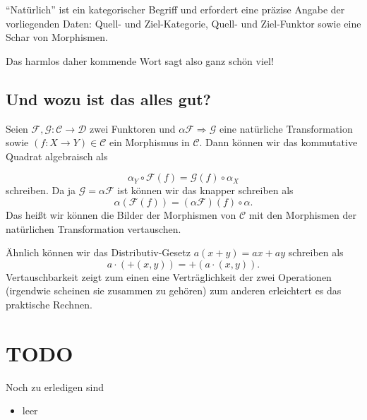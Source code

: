 \documentclass[a4paper]{amsart}
\theoremstyle{definition}
\newcommand{\m}{\mathcal}
\begin{document}
"`Natürlich"' ist ein kategorischer Begriff und erfordert eine präzise Angabe der vorliegenden Daten: Quell- und Ziel-Kategorie, Quell- und Ziel-Funktor sowie eine Schar von Morphismen.

Das harmlos daher kommende Wort sagt also ganz schön viel!

\subsection{Und wozu ist das alles gut?}
Seien $\m F, \m G \colon \m C \to \mathcal  D$ zwei Funktoren und $\alpha \m F \Rightarrow \m G$ eine natürliche Transformation sowie $(f \colon X \to Y) \in \mathcal C$ ein Morphismus in $\mathcal  C$. Dann können wir das kommutative Quadrat algebraisch als

\begin{equation}
   \alpha_Y \circ \m F(f) = \m G(f) \circ \alpha_X
\end{equation}
schreiben. Da ja $\m G = \alpha \m F$ ist können wir das knapper schreiben als
\begin{equation}
   \alpha( \m F(f) ) = (\alpha \m F)(f) \circ \alpha.
\end{equation}
Das heißt wir können die Bilder der Morphismen von $\mathcal C$ mit den Morphismen der natürlichen Transformation vertauschen.

Ähnlich können wir das Distributiv-Gesetz $a(x+y) = ax + ay$ schreiben als
\begin{equation}
   a \cdot ( +(x,y)) = +(a \cdot (x,y)).
\end{equation}
Vertauschbarkeit zeigt zum einen eine Verträglichkeit der zwei Operationen (irgendwie scheinen sie zusammen zu gehören) zum anderen erleichtert es das praktische Rechnen.

\section{TODO}
\begin{backup}
Noch zu erledigen sind
\begin{itemize}
   \item leer
\end{itemize}
\end{backup}
\end{document}
